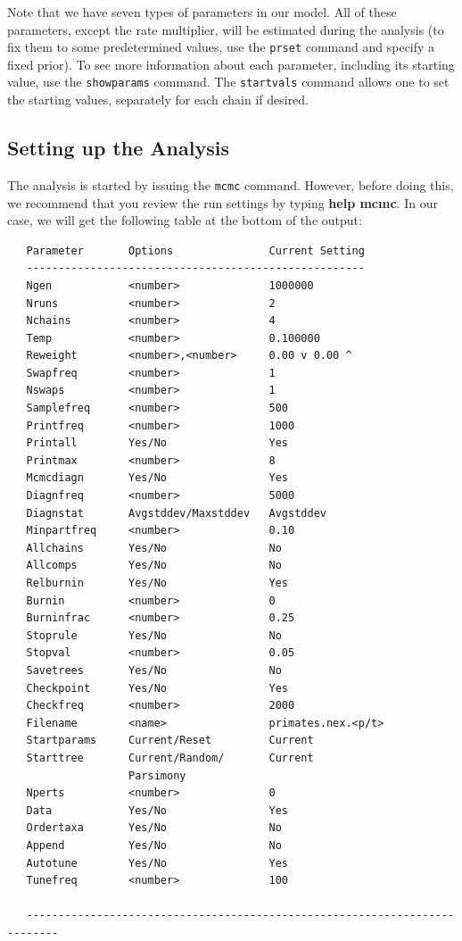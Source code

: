 \documentclass[12pt]{book}
\begin{document}
Note that we have seven types of parameters in our model. All of these parameters, except the rate
multiplier, will be estimated during the analysis (to fix them to some predetermined values, use
the \texttt{prset} command and specify a fixed prior). To see more information about each
parameter, including its starting value, use the \texttt{showparams} command. The
\texttt{startvals} command allows one to set the starting values, separately for each chain if
desired.

\subsection{Setting up the Analysis}

The analysis is started by issuing the \texttt{mcmc} command. However, before doing this, we
recommend that you review the run settings by typing \textbf{help mcmc}. In our case, we will get
the following table at the bottom of the output:

\begin{singlespacing}
\footnotesize
\begin{verbatim}
   Parameter       Options               Current Setting
   -----------------------------------------------------
   Ngen            <number>              1000000
   Nruns           <number>              2
   Nchains         <number>              4
   Temp            <number>              0.100000
   Reweight        <number>,<number>     0.00 v 0.00 ^
   Swapfreq        <number>              1
   Nswaps          <number>              1
   Samplefreq      <number>              500
   Printfreq       <number>              1000
   Printall        Yes/No                Yes
   Printmax        <number>              8
   Mcmcdiagn       Yes/No                Yes
   Diagnfreq       <number>              5000
   Diagnstat       Avgstddev/Maxstddev   Avgstddev
   Minpartfreq     <number>              0.10
   Allchains       Yes/No                No
   Allcomps        Yes/No                No
   Relburnin       Yes/No                Yes
   Burnin          <number>              0
   Burninfrac      <number>              0.25
   Stoprule        Yes/No                No
   Stopval         <number>              0.05
   Savetrees       Yes/No                No
   Checkpoint      Yes/No                Yes
   Checkfreq       <number>              2000
   Filename        <name>                primates.nex.<p/t>
   Startparams     Current/Reset         Current
   Starttree       Current/Random/       Current
                   Parsimony
   Nperts          <number>              0
   Data            Yes/No                Yes
   Ordertaxa       Yes/No                No
   Append          Yes/No                No
   Autotune        Yes/No                Yes
   Tunefreq        <number>              100

   ---------------------------------------------------------------------------
\end{verbatim}
\normalsize
\end{singlespacing}
\end{document}
